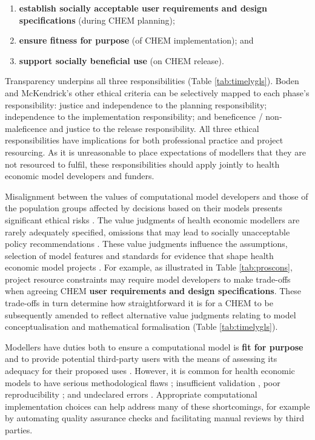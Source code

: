 \documentclass[sn-vancouver,Numbered,pdflatex]{sn-jnl}
\theoremstyle{remark}
\theoremstyle{definition}
\begin{document}
\begin{enumerate}
\def\labelenumi{(\roman{enumi})}
\item
  \textbf{establish socially acceptable user requirements and design specifications} (during CHEM planning);
\item
  \textbf{ensure fitness for purpose} (of CHEM implementation); and
\item
  \textbf{support socially beneficial use} (on CHEM release).
\end{enumerate}

Transparency underpins all three responsibilities (Table \ref{tab:timelygls}). Boden and McKendrick's other ethical criteria can be selectively mapped to each phase's responsibility: justice and independence to the planning responsibility; independence to the implementation responsibility; and beneficence / non-maleficence and justice to the release responsibility. All three ethical responsibilities have implications for both professional practice and project resourcing. As it is unreasonable to place expectations of modellers that they are not resourced to fulfil, these responsibilities should apply jointly to health economic model developers and funders.

Misalignment between the values of computational model developers and those of the population groups affected by decisions based on their models presents significant ethical risks \citep{thompson2022escape, duckett2022journey}. The value judgments of health economic modellers are rarely adequately specified, omissions that may lead to socially unacceptable policy recommendations \citep{duckett2022journey}. These value judgments influence the assumptions, selection of model features and standards for evidence that shape health economic model projects \citep{HARVARD2020112975}. For example, as illustrated in Table \ref{tab:proscons}, project resource constraints may require model developers to make trade-offs when agreeing CHEM \textbf{user requirements and design specifications}. These trade-offs in turn determine how straightforward it is for a CHEM to be subsequently amended to reflect alternative value judgments relating to model conceptualisation and mathematical formalisation (Table \ref{tab:timelygls}).

Modellers have duties both to ensure a computational model is \textbf{fit for purpose} and to provide potential third-party users with the means of assessing its adequacy for their proposed uses \citep{Erdemir2020, Feenstra2022, thompson2019escape, 10.3389/fpubh.2017.00068}. However, it is common for health economic models to have serious methodological flaws \citep{carletto_zanuzzi_sammarco_russo_2020, WONDER2015467}; insufficient validation \citep{Ghabri2019, kolovos2017model, haji2013model}, poor reproducibility \citep{Jalali2021, McManus2019, Bermejo2017}; and undeclared errors \citep{Radeva2020}. Appropriate computational implementation choices can help address many of these shortcomings, for example by automating quality assurance checks and facilitating manual reviews by third parties.
\end{document}
